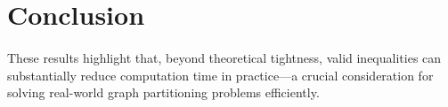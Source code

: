 \section{Conclusion}
\label{sec:conclusion}

\paragraph{} These results highlight that, beyond theoretical tightness, valid inequalities can substantially reduce computation time in practice—a crucial consideration for solving real-world graph partitioning problems efficiently.